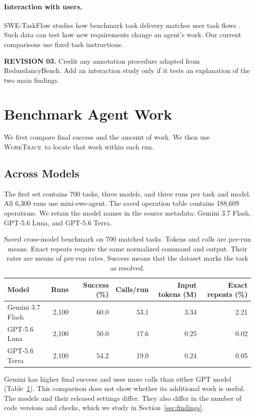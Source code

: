 \documentclass[10pt,a4paper,twocolumn]{article}
\newcommand{\rev}[2]{\par\smallskip\noindent\begin{minipage}{\linewidth}\color{revision}\footnotesize\textbf{REVISION #1.} #2\end{minipage}\par\smallskip}
\newcommand{\wt}{\textsc{WorkTrace}}
\begin{document}
\paragraph{Interaction with users.}
SWE-TaskFlow studies how benchmark task delivery matches user task flows \citep{taskflow}. Such data can test how new requirements change an agent's work. Our current comparisons use fixed task instructions.
\rev{03}{Credit any annotation procedure adapted from RedundancyBench. Add an interaction study only if it tests an explanation of the two main findings.}

\section{Benchmark Agent Work}
We first compare final success and the amount of work. We then use \wt\ to locate that work within each run.
\subsection{Across Models}
The first set contains 700 tasks, three models, and three runs per task and model. All 6,300 runs use mini-swe-agent. The saved operation table contains 188,609 operations. We retain the model names in the source metadata: Gemini 3.7 Flash, GPT-5.6 Luna, and GPT-5.6 Terra.
\begin{table}[t]
\centering\small\setlength{\tabcolsep}{8pt}
\begin{tabular}{lrrrrr}
\toprule
Model & Runs & Success (\%) & Calls/run & Input tokens (M) & Exact repeats (\%)\\
\midrule
Gemini 3.7 Flash & 2,100 & 60.0 & 53.1 & 3.34 & 2.21\\
GPT-5.6 Luna & 2,100 & 50.0 & 17.6 & 0.25 & 0.02\\
GPT-5.6 Terra & 2,100 & 54.2 & 19.0 & 0.24 & 0.05\\
\bottomrule
\end{tabular}
\caption{Saved cross-model benchmark on 700 matched tasks. Tokens and calls are per-run means. Exact repeats require the same normalized command and output. Their rates are means of per-run rates. Success means that the dataset marks the task as resolved.}
\label{tab:model}
\end{table}
Gemini has higher final success and uses more calls than either GPT model (Table~\ref{tab:model}). This comparison does not show whether its additional work is useful. The models and their released settings differ. They also differ in the number of code versions and checks, which we study in Section~\ref{sec:findings}.
\end{document}
